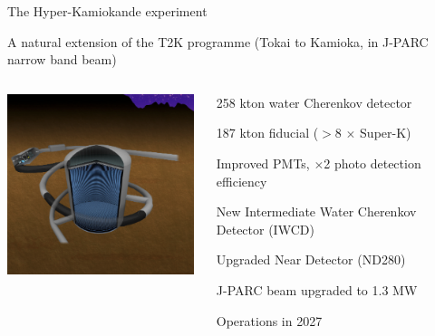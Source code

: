 \begin{frame}{The Hyper-Kamiokande experiment}

{\scriptsize A natural extension of the T2K programme
(Tokai to Kamioka, in J-PARC narrow band beam)}\\

\vspace{0.3cm}

\begin{columns}[t]
  \begin{column}{0.49\textwidth}
    \includegraphics[width=0.98\textwidth]{./images/3nu/accelerator/hyperk_schematic_2021a}\\
  \end{column}
  \begin{column}{0.50\textwidth}
    \vspace{-3.7cm}
    \begin{itemize}
    {\scriptsize
       \item 258 kton water Cherenkov detector
       \item 187 kton fiducial ($>$8 $\times$ Super-K)
       \item Improved PMTs, $\times$2 photo detection efficiency
       \item New Intermediate Water Cherenkov Detector (IWCD)
       \item Upgraded Near Detector (ND280)
       \item J-PARC beam upgraded to 1.3 MW
       \item Operations in 2027\\
    }
    \end{itemize}
  \end{column}
\end{columns}
\end{frame}


